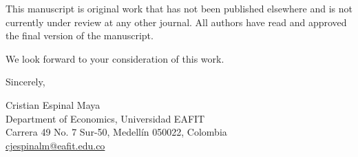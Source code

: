 \documentclass[12pt]{article}
\begin{document}
This manuscript is original work that has not been published elsewhere and is not currently under review at any other journal. All authors have read and approved the final version of the manuscript.

We look forward to your consideration of this work.

\vspace{0.5cm}

Sincerely,

\vspace{0.5cm}

Cristian Espinal Maya\\
Department of Economics, Universidad EAFIT\\
Carrera 49 No. 7 Sur-50, Medell\'in 050022, Colombia\\
\href{mailto:cjespinalm@eafit.edu.co}{cjespinalm@eafit.edu.co}
\end{document}
